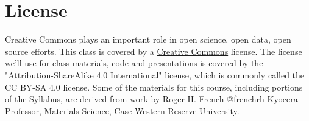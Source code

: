 \documentclass[11pt]{article} %
\begin{document}

\section{License}
  
    Creative Commons plays an important role in open science, open data, open source efforts. This class is covered by a \href{"http://creativecommons.org/licenses/"}{Creative Commons} license. The license we'll use for class materials, code and presentations is covered by  the "Attribution-ShareAlike 4.0 International" license, which is commonly called the CC BY-SA 4.0 license. Some of the materials for this course, including portions of the Syllabus, are derived from work by Roger H. French \href{"https://twitter.com/frenchrh"}{@frenchrh} Kyocera Professor, Materials Science, Case Western Reserve University.

\end{document}
